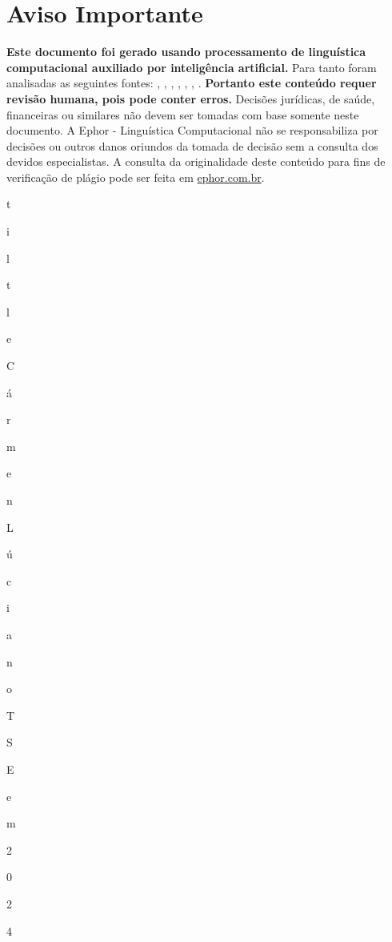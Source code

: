 \documentclass[
   article,       
   12pt,          
   oneside,       
   a4paper,       
   english,       
   brazil,        
   sumario=tradicional
   ]{abntex2}
\begin{document}
\frenchspacing 
\maketitle

\textual
\section{Aviso Importante}
\textbf{Este documento foi gerado usando processamento de linguística computacional auxiliado por inteligência artificial.} Para tanto foram analisadas as seguintes fontes:  \cite{As_duas_preocupacoes_que_rondam_Carmen_Lucia_}, \cite{Carmen_Lucia_tem_de_afastar_TSE_da_polarizaca}, \cite{Carmen_Lucia_toma_posse_na_presidencia_do_TSE}, \cite{Contra_o_virus_da_mentira_ha_o_remedio_da_inf}, \cite{Mendonca_e_o_unico_ministro_do_STF_a_faltar_a}, \cite{Pacheco_participa_da_posse_na_Carmen_Lucia_na}, \cite{Quem_centraliza_poderes_em_uma_pessoa_chamase}.
\textbf{Portanto este conteúdo requer revisão humana, pois pode conter erros.} Decisões jurídicas, de saúde, financeiras ou similares não devem ser tomadas com base somente neste documento. A Ephor - Linguística Computacional não se responsabiliza por decisões ou outros danos oriundos da tomada de decisão sem a consulta dos devidos especialistas.
A consulta da originalidade deste conteúdo para fins de verificação de plágio pode ser feita em \href{http://www.ephor.com.br}{ephor.com.br}.
\

t

i

l

t

l

e

{

C

á

r

m

e

n

 

L

ú

c

i

a

 

n

o

 

T

S

E

 

e

m

 

2

0

2

4

}
\end{document}
